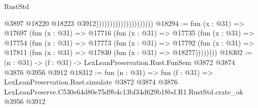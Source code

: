 \begin{lexlean}{RustStd}
\begin{coremodule}
                                              @3897
                                              @18220
                                              @18223
                                              @3912)))))))))))))))))))))
@18294 := fun (x : @31) =>
  @17697
    (fun (x : @31) =>
    @17716
      (fun (x : @31) =>
      @17735
        (fun (x : @31) =>
        @17754
          (fun (x : @31) =>
          @17773
            (fun (x : @31) =>
            @17792
              (fun (x : @31) => @17811 (fun (x : @31) => @17830 (fun (x : @31) => @18277))))))))
@18302 := (n : @31) -> (f : @31) -> LexLeanPreservation.Rust.FunSem @3872 @3874 @3876 @3956 @3912
@18312 := fun (n : @31) =>
  fun (f : @31) =>
  LexLeanPreservation.Rust.simulate
    @3872
    @3874
    @3876
    LexLeanPreserve.C530e64d80e75d9b4c13bf34d629b18bd.R1.RustStd.crate_ok
    @3956
    @3912
\end{coremodule}
\end{lexlean}
